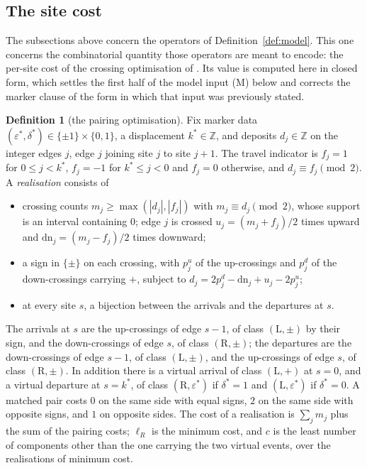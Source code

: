 \documentclass[11pt]{article}
\theoremstyle{plain}
\theoremstyle{definition}
\newtheorem{definition}[theorem]{Definition}
\theoremstyle{remark}
\newcommand{\Z}{\mathbb{Z}}
\begin{document}
\subsection{The site cost}\label{sec:sitecost}

The subsections above concern the operators of Definition~\ref{def:model}. This one concerns the
combinatorial quantity those operators are meant to encode: the per-site cost of the crossing
optimisation of \cite{Bonfioli2026a}. Its value is computed here in closed form, which settles the
first half of the model input \textup{(M)} below and corrects the marker clause of the form in
which that input was previously stated.

\begin{definition}[the pairing optimisation]\label{def:pairing}
Fix marker data $(\varepsilon^\ast,\delta^\ast)\in\{\pm1\}\times\{0,1\}$, a displacement
$k^\ast\in\Z$, and deposits $d_j\in\Z$ on the integer edges $j$, edge $j$ joining site $j$ to site
$j+1$. The travel indicator is $f_j=1$ for $0\le j<k^\ast$, $f_j=-1$ for $k^\ast\le j<0$ and
$f_j=0$ otherwise, and $d_j\equiv f_j\pmod2$. A \emph{realisation} consists of
\begin{itemize}[leftmargin=1.6em,itemsep=0.1em,topsep=0.2em]
\item crossing counts $m_j\ge\max(|d_j|,|f_j|)$ with $m_j\equiv d_j\pmod2$, whose support is an
      interval containing $0$; edge $j$ is crossed $u_j=(m_j+f_j)/2$ times upward and
      $\mathrm{dn}_j=(m_j-f_j)/2$ times downward;
\item a sign in $\{\pm\}$ on each crossing, with $p^u_j$ of the up-crossings and $p^d_j$ of the
      down-crossings carrying $+$, subject to
      $d_j=2p^d_j-\mathrm{dn}_j+u_j-2p^u_j$;
\item at every site $s$, a bijection between the arrivals and the departures at $s$.
\end{itemize}
The arrivals at $s$ are the up-crossings of edge $s-1$, of class $(\mathrm L,\pm)$ by their sign,
and the down-crossings of edge $s$, of class $(\mathrm R,\pm)$; the departures are the
down-crossings of edge $s-1$, of class $(\mathrm L,\pm)$, and the up-crossings of edge $s$, of
class $(\mathrm R,\pm)$. In addition there is a virtual arrival of class $(\mathrm L,+)$ at $s=0$,
and a virtual departure at $s=k^\ast$, of class $(\mathrm R,\varepsilon^\ast)$ if $\delta^\ast=1$
and $(\mathrm L,\varepsilon^\ast)$ if $\delta^\ast=0$. A matched pair costs $0$ on the same side
with equal signs, $2$ on the same side with opposite signs, and $1$ on opposite sides. The cost of
a realisation is $\sum_jm_j$ plus the sum of the pairing costs; $\ell_R$ is the minimum cost, and
$c$ is the least number of components other than the one carrying the two virtual events, over the
realisations of minimum cost.
\end{definition}
\end{document}
